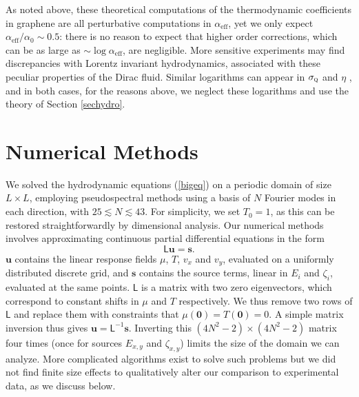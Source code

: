 \documentclass[10pt, oneside]{book}
\begin{document}
\begin{doublespace}
\begin{appendix}
As noted above, these theoretical computations of the thermodynamic coefficients in graphene are all perturbative computations in $\alpha_{\mathrm{eff}}$,  yet we only expect $\alpha_{\mathrm{eff}}/\alpha_0\sim 0.5$:  there is no reason to expect that higher order corrections, which can be as large as $\sim \log \alpha_{\mathrm{eff}}$, are negligible.  More sensitive experiments may find discrepancies with Lorentz invariant hydrodynamics, associated with these peculiar properties of the Dirac fluid.   Similar logarithms can appear in $\sigma_{\textsc{q}}$ \cite{muller2} and $\eta$ \cite{muller2009}, and in both cases, for the reasons above, we neglect these logarithms and use the theory of Section \ref{sechydro}.
   

\section{Numerical Methods}\label{appfin}
We solved the hydrodynamic equations (\ref{bigeq}) on a periodic domain of size $L\times L$, employing pseudospectral methods \cite{trefethen} using a basis of $N$ Fourier modes in each direction, with $25 \lesssim N \lesssim 43$.   For simplicity, we set $T_0=1$, as this can be restored straightforwardly by dimensional analysis.   Our numerical methods involves approximating continuous partial differential equations in the form \begin{equation}
\mathsf{L} \mathbf{u} = \mathbf{s}.
\end{equation}
 $\mathbf{u}$ contains the linear response fields $\mu$, $T$, $v_x$ and $v_y$, evaluated on a uniformly distributed discrete grid, and $\mathbf{s}$ contains the source terms, linear in $E_i$ and $\zeta_i$, evaluated at the same points.   $\mathsf{L}$ is a matrix with two zero eigenvectors, which correspond to constant shifts in $\mu$ and $T$ respectively.  We thus remove two rows of $\mathsf{L}$ and replace them with constraints that $\mu(\mathbf{0}) = T(\mathbf{0}) = 0$.  A simple matrix inversion thus gives $\mathbf{u} = \mathsf{L}^{-1}\mathbf{s}$.   Inverting this $(4N^2-2)\times (4N^2-2)$ matrix four times (once for sources $E_{x,y}$ and $\zeta_{x,y}$) limits the size of the domain we can analyze.   More complicated algorithms exist \cite{domaindec} to solve such problems but we did not find finite size effects to qualitatively alter our comparison to experimental data, as we discuss below.
 

\end{appendix}
\end{doublespace}
\end{document}
